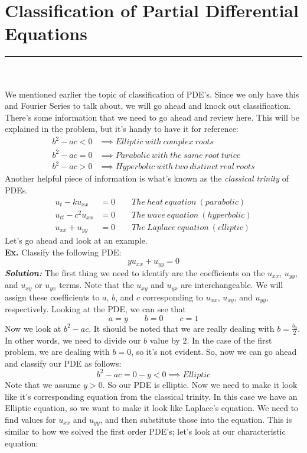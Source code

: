 \documentclass{article}
\begin{document}
\section{Classification of Partial Differential Equations}
\hrule
\noindent\\\\
\indent We mentioned earlier the topic of classification of PDE's. Since we only have this and Fourier Series to talk about, we will go ahead and knock out classification. There's some information that we need to go ahead and review here. This will be explained in the problem, but it's handy to have it for reference: 
\begin{align*}
b^{2} - ac < 0 &\implies Elliptic\ with\ complex\ roots\\
b^{2} - ac = 0 &\implies Parabolic\ with\ the\ same\ root\ twice\\
b^{2} - ac > 0 &\implies Hyperbolic\ with\ two\ distinct\ real\ roots
\end{align*}
\noindent Another helpful piece of information is what's known as the \textit{classical trinity} of PDEs.
\begin{align*}
u_{t} - ku_{xx} &= 0 \qquad The\ heat\ equation\ (parabolic)\\
u_{tt} - c^{2}u_{xx} &= 0 \qquad The\ wave\ equation\ (hyperbolic)\\
u_{xx} + u_{yy} &= 0 \qquad The\ Laplace\ equation\ (elliptic)
\end{align*}
Let's go ahead and look at an example.\\
\indent \textbf{Ex. }Classify the following PDE:
\[yu_{xx} + u_{yy} = 0\]
\indent \textbf{\textit{Solution:}} The first thing we need to identify are the coefficients on the $u_{xx}$, $u_{yy}$, and $u_{xy}$ or $u_{yx}$ terms. Note that the $u_{xy}$ and $u_{yx}$ are interchangeable. We will assign these coefficients to $a$, $b$, and $c$ corresponding to $u_{xx}$, $u_{xy}$, and $u_{yy}$, respectively. Looking at the PDE, we can see that
\[
a = y \qquad b = 0 \qquad c = 1
\]
\noindent Now we look at $b^{2} - ac$. It should be noted that we are really dealing with $b = \frac{b_{0}}{2}$. In other words, we need to divide our $b$ value by $2$. In the case of the first problem, we are dealing with $b = 0$, so it's not evident. So, now we can go ahead and classify our PDE as follows:
\[
b^{2} - ac = 0 - y < 0 \implies Elliptic
\]
Note that we assume $y > 0$. So our PDE is elliptic. Now we need to make it look like it's corresponding equation from the classical trinity. In this case we have an Elliptic equation, so we want to make it look like Laplace's equation. We need to find values for $u_{xx}$ and $u_{yy}$, and then substitute those into the equation. This is similar to how we solved the first order PDE's; let's look at our characteristic equation:
\end{document}
